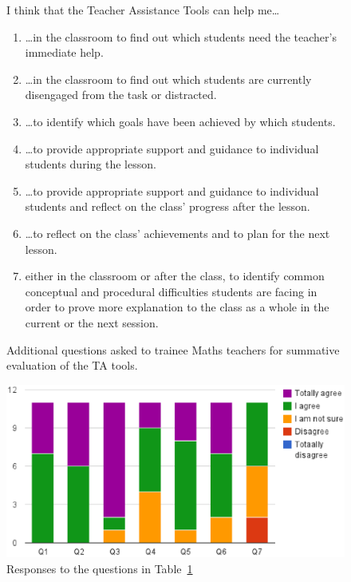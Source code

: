\begin{figure}[htbp]
  \begin{framed}
  I think that the Teacher Assistance Tools can help me\ldots
  \begin{enumerate}
  \item \ldots in the
    classroom to find out which students need the teacher's immediate
    help.
  \item \ldots in the classroom to find out which students are
    currently disengaged from the task or distracted.
  \item \ldots to identify which goals have been achieved by which
    students.
  \item \ldots to provide appropriate support and guidance to individual
    students during the lesson.
  \item \ldots to provide appropriate support and guidance to individual
    students and reflect on the class' progress after the lesson.
  \item \ldots to reflect on the class' achievements and to plan for
    the next lesson.
  \item either in the classroom or after the class, to identify common
    conceptual and procedural difficulties students are facing in
    order to prove more explanation to the class as a whole in the
    current or the next session.
  \end{enumerate}
  \end{framed}
  \vspace{-1em}
  \caption{Additional questions asked to trainee Maths teachers for 
    summative evaluation of the TA tools.} 
  \label{fig:questions2-pgce}    
\end{figure}



\begin{figure}[htbp]
  \centering
    \includegraphics[width=\textwidth]{gfx/agreement.eps}
  \caption{Responses to the questions in Table~\ref{fig:questions2-pgce}} 
\label{fig:additional}
\end{figure}

